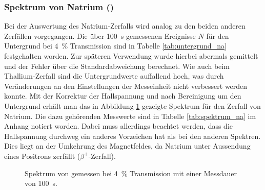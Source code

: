 \documentclass[11pt, a4paper]{article}
\numberwithin{equation}{section}
\begin{document}
\subsubsection{Spektrum von Natrium ()}
\begin{table}
	\centering
	
	\caption{Untergrundmessung für  mit Messdauer \SI{100}{\second} bei \SI{4}{\percent} Transmission.}
	\label{tab:untergrund_na}
\end{table}
Bei der Auswertung des Natrium-Zerfalls wird analog zu den beiden anderen Zerfällen vorgegangen.
Die über \SI{100}{\second} gemessenen Ereignisse $N$ für den Untergrund bei \SI{4}{\percent} Transmission sind in Tabelle \ref{tab:untergrund_na} festgehalten worden.
Zur späteren Verwendung wurde hierbei abermals gemittelt und der Fehler über die Standardabweichung berechnet.
Wie auch beim Thallium-Zerfall sind die Untergrundwerte auffallend hoch, was durch Veränderungen an den Einstellungen der Messeinheit nicht verbessert werden konnte.
Mit der Korrektur der Hallspannung und nach Bereinigung um den Untergrund erhält man das in Abbildung \ref{fig:natrium_spectrum} gezeigte Spektrum für den Zerfall von Natrium.
Die dazu gehörenden Messwerte sind in Tabelle \ref{tab:spektrum_na} im Anhang notiert worden.
Dabei muss allerdings beachtet werden, dass die Hallspannung durchweg ein anderes Vorzeichen hat als bei den anderen Spektren.
Dies liegt an der Umkehrung des Magnetfeldes, da Natrium unter Aussendung eines Positrons zerfällt ($\beta^+$-Zerfall).
\begin{figure}[h]
	\centering
	
	\caption{Spektrum von  gemessen bei \SI{4}{\percent} Transmission mit einer Messdauer von \SI{100}{\second}.}
	\label{fig:natrium_spectrum}
\end{figure}
\FloatBarrier
\end{document}
